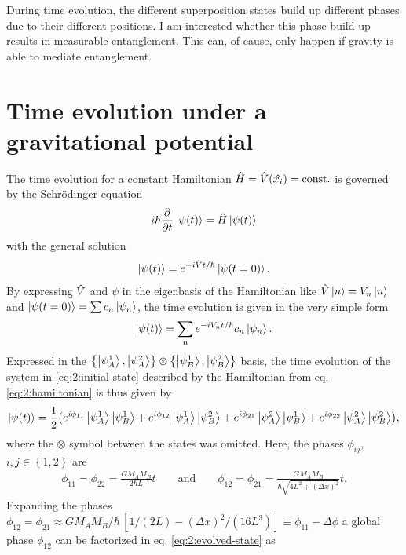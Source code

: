 During time evolution, the different superposition states build up different phases due to their different positions. I am interested whether this phase build-up results in measurable entanglement. This can, of cause, only happen if gravity is able to mediate entanglement.



\section{Time evolution under a gravitational potential}
The time evolution for a constant Hamiltonian $\hat{H} = \hat{V}(\hat{x_i}) = \mathrm{const.}$ is governed by the Schrödinger equation
\begin{equation}
  i\hbar \pdv{t}\ket{\psi(t)} = \hat{H} \ket{\psi(t)}
\end{equation}
with the general solution
\begin{equation}
  \ket{\psi(t)} = e^{-i \hat{V} t / \hbar} \ket{\psi(t=0)} .
\end{equation}
By expressing $\hat{V}$ and $\psi$ in the eigenbasis of the Hamiltonian like $\hat{V}\ket{n} = V_n \ket{n}$ and $\ket{\psi(t=0)} = \sum c_n \ket{\psi_n}$, the time evolution is given in the very simple form
\begin{equation}
  \ket{\psi(t)} = \sum_n e^{-i V_n t /\hbar} c_n \ket{\psi_n} .
\end{equation}
Expressed in the $\left\{ \ket{\psi_A^1}, \ket{\psi_A^2} \right\}\otimes \left\{ \ket{\psi_B^1}, \ket{\psi_B^2} \right\}$ basis, the time evolution of the system in \eqref{eq:2:initial-state} described by the Hamiltonian from eq. \eqref{eq:2:hamiltonian} is thus given by
\begin{equation}\label{eq:2:evolved-state}
  \ket{\psi(t)} = \frac{1}{2}\bigl(
    e^{i\phi_{11}} \ket{\psi_A^1}\ket{\psi_B^1} 
    + e^{i\phi_{12}} \ket{\psi_A^1}\ket{\psi_B^2}
    + e^{i\phi_{21}} \ket{\psi_A^2}\ket{\psi_B^1} 
    + e^{i\phi_{22}} \ket{\psi_A^2}\ket{\psi_B^2} \bigr) ,
\end{equation}
where the $\otimes$ symbol between the states was omitted.
Here, the phases $\phi_{ij}$, $i,j \in \left\{1,2\right\}$ are
\begin{align}
  \phi_{11}=\phi_{22} = \frac{G M_A M_B}{2\hbar L}t 
  \qquad \text{and} \qquad 
  \phi_{12}=\phi_{21} = \frac{G M_A M_B}{\hbar \sqrt{4L^2 + (\Delta x)^2}}t.
\end{align}
Expanding the phases $\phi_{12} = \phi_{21} \approx G M_A M_B/\hbar \, \left[ 1/(2L) - (\Delta x)^2/(16L^3) \right] \equiv \phi_{11} - \Delta \phi$ a global phase $\phi_{12}$ can be factorized in eq. \eqref{eq:2:evolved-state} as
